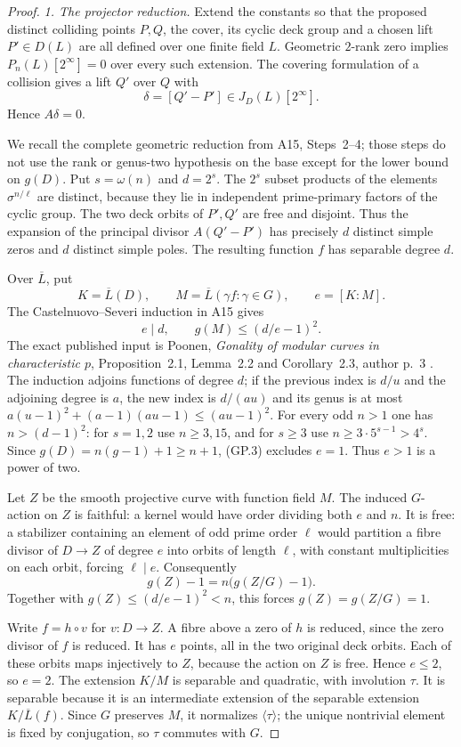 \documentclass[11pt,a4paper]{article}
\begin{document}
\begin{proof}
\emph{1. The projector reduction.}
Extend the constants so that the proposed distinct colliding
points $P,Q$, the cover, its cyclic deck group and a chosen lift
$P'\in D(L)$ are all defined over one finite field $L$.
Geometric $2$-rank zero implies
$P_n(L)[2^\infty]=0$ over every such extension.
The covering formulation of a collision gives a lift $Q'$ over
$Q$ with
\[
                       \delta=[Q'-P']\in J_D(L)[2^\infty].
\]
Hence $A\delta=0$.

We recall the complete geometric reduction from A15,
Steps~2--4; those steps do not use the rank or genus-two
hypothesis on the base except for the lower bound on $g(D)$.
Put $s=\omega(n)$ and $d=2^s$.
The $2^s$ subset products of the elements $\sigma^{n/\ell}$
are distinct, because they lie in independent prime-primary
factors of the cyclic group.  The two deck orbits of $P',Q'$
are free and disjoint.  Thus the expansion of the principal
divisor $A(Q'-P')$ has precisely $d$ distinct simple zeros and
$d$ distinct simple poles.  The resulting function $f$ has
separable degree $d$.

Over $\overline L$, put
\[
 K=\overline L(D),\qquad
 M=\overline L(\gamma f:\gamma\in G),\qquad e=[K:M].
\]
The Castelnuovo--Severi induction in A15 gives
\[
                 e\mid d,\qquad g(M)\le(d/e-1)^2.
 \tag{GP.3}
\]
The exact published input is Poonen,
\emph{Gonality of modular curves in characteristic $p$},
Proposition~2.1, Lemma~2.2 and Corollary~2.3,
author p.~3 \cite{Poonen2007Gonality}.  The induction adjoins functions of degree $d$;
if the previous index is $d/u$ and the adjoining degree is $a$,
the new index is $d/(au)$ and its genus is at most
$a(u-1)^2+(a-1)(au-1)\le(au-1)^2$.
For every odd $n>1$ one has $n>(d-1)^2$:
for $s=1,2$ use $n\ge3,15$, and for $s\ge3$ use
$n\ge3\cdot5^{s-1}>4^s$.
Since $g(D)=n(g-1)+1\ge n+1$, (GP.3) excludes $e=1$.
Thus $e>1$ is a power of two.

Let $Z$ be the smooth projective curve with function field $M$.
The induced $G$-action on $Z$ is faithful: a kernel would have
order dividing both $e$ and $n$.
It is free: a stabilizer containing an element of odd prime
order $\ell$ would partition a fibre divisor of $D\to Z$
of degree $e$ into orbits of length $\ell$, with constant
multiplicities on each orbit, forcing $\ell\mid e$.
Consequently
\[
                 g(Z)-1=n\bigl(g(Z/G)-1\bigr).
\]
Together with $g(Z)\le(d/e-1)^2<n$, this forces
$g(Z)=g(Z/G)=1$.

Write $f=h\circ v$ for $v:D\to Z$.
A fibre above a zero of $h$ is reduced, since the zero divisor
of $f$ is reduced.  It has $e$ points, all in the two original
deck orbits.  Each of these orbits maps injectively to $Z$,
because the action on $Z$ is free.  Hence $e\le2$, so $e=2$.
The extension $K/M$ is separable and quadratic, with involution
$\tau$.  It is separable because it is an intermediate extension
of the separable extension $K/\overline L(f)$.
Since $G$ preserves $M$, it normalizes $\langle\tau\rangle$;
the unique nontrivial element is fixed by conjugation, so
$\tau$ commutes with $G$.


\end{proof}
\end{document}
